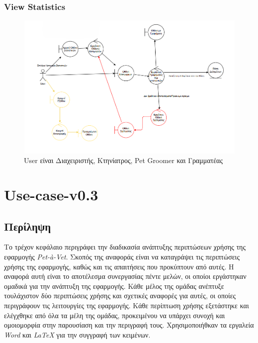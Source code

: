 \documentclass[12pt,a4paper,twoside]{book}
\begin{document}
\subsection{View Statistics}
\begin{figure}[H]
    \centering
    \includegraphics[width=\textwidth]{Resources/Robustness Diagram/Statistics.png}
    \caption{User είναι Διαχειριστής, Κτηνίατρος, Pet Groomer και Γραμματέας}\label{fig:robustness-view-statistics}
\end{figure}

\chapter{Use-case-v0.3}

\section{Περίληψη}

Το τρέχον κεφάλαιο περιγράφει την διαδικασία ανάπτυξης περιπτώσεων χρήσης της εφαρμογής \textit{Pet-à-Vet}. Σκοπός της αναφοράς είναι να καταγράψει τις περιπτώσεις χρήσης της εφαρμογής, καθώς και τις απαιτήσεις που προκύπτουν από αυτές. Η αναφορά αυτή είναι το αποτέλεσμα συνεργασίας πέντε μελών, οι οποίοι εργάστηκαν ομαδικά για την ανάπτυξη της εφαρμογής. Κάθε μέλος της ομάδας ανέπτυξε τουλάχιστον δύο περιπτώσεις χρήσης και σχετικές αναφορές για αυτές, οι οποίες περιγράφουν τις λειτουργίες της εφαρμογής. Κάθε περίπτωση χρήσης εξετάστηκε και ελέγχθηκε από όλα τα μέλη της ομάδας, προκειμένου να υπάρχει συνοχή και ομοιομορφία στην παρουσίαση και την περιγραφή τους. Χρησιμοποιήθκαν τα εργαλεία \textit{Word} και \textit{LaTeX} για την συγγραφή των κειμένων. %
\end{document}
